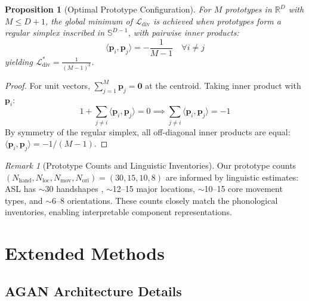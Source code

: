 \documentclass[sigconf,nonacm,anonymous]{acmart}
\newtheorem{proposition}[theorem]{Proposition}
\theoremstyle{definition}
\theoremstyle{remark}
\newtheorem{remark}[theorem]{Remark}
\begin{document}
\begin{proposition}[Optimal Prototype Configuration]
\label{prop:optimal_config}
For $M$ prototypes in $\mathbb{R}^D$ with $M \leq D+1$, the global minimum of $\mathcal{L}_{\text{div}}$ is achieved when prototypes form a regular simplex inscribed in $\mathbb{S}^{D-1}$, with pairwise inner products:
\begin{equation}
\langle \mathbf{p}_i, \mathbf{p}_j \rangle = -\frac{1}{M-1} \quad \forall i \neq j
\end{equation}
yielding $\mathcal{L}_{\text{div}}^* = \frac{1}{(M-1)^2}$.
\end{proposition}

\begin{proof}
For unit vectors, $\sum_{j=1}^M \mathbf{p}_j = \mathbf{0}$ at the centroid. Taking inner product with $\mathbf{p}_i$:
\begin{equation}
1 + \sum_{j \neq i} \langle \mathbf{p}_i, \mathbf{p}_j \rangle = 0 \implies \sum_{j \neq i} \langle \mathbf{p}_i, \mathbf{p}_j \rangle = -1
\end{equation}
By symmetry of the regular simplex, all off-diagonal inner products are equal: $\langle \mathbf{p}_i, \mathbf{p}_j \rangle = -1/(M-1)$.
\end{proof}

\begin{remark}[Prototype Counts and Linguistic Inventories]
Our prototype counts $(N_{\text{hand}}, N_{\text{loc}}, N_{\text{mov}}, N_{\text{ori}}) = (30, 15, 10, 8)$ are informed by linguistic estimates: ASL has $\sim$30 handshapes \cite{battison1978lexical}, $\sim$12--15 major locations, $\sim$10--15 core movement types, and $\sim$6--8 orientations. These counts closely match the phonological inventories, enabling interpretable component representations.
\end{remark}

\section{Extended Methods}

\subsection{AGAN Architecture Details}
\end{document}
